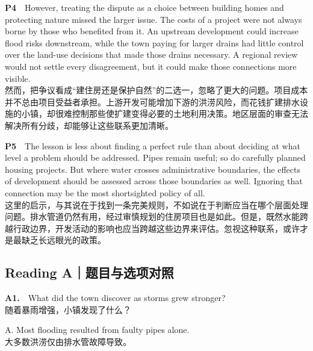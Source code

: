\documentclass[a4paper,11pt,openany]{report}
\newcommand{\zhline}[1]{{\CJKsf\color{bodygrey}#1}}
\begin{document}
\begin{samepage}
\textbf{P4}　However, treating the dispute as a choice between building homes and protecting nature missed the larger issue. The costs of a project were not always borne by those who benefited from it. An upstream development could increase flood risks downstream, while the town paying for larger drains had little control over the land-use decisions that made those drains necessary. A regional review would not settle every disagreement, but it could make those connections more visible.\\
\zhline{然而，把争议看成``建住房还是保护自然''的二选一，忽略了更大的问题。项目成本并不总由项目受益者承担。上游开发可能增加下游的洪涝风险，而花钱扩建排水设施的小镇，却很难控制那些使扩建变得必要的土地利用决策。地区层面的审查无法解决所有分歧，却能够让这些联系更加清晰。}
\par\end{samepage}

\begin{samepage}
\textbf{P5}　The lesson is less about finding a perfect rule than about deciding at what level a problem should be addressed. Pipes remain useful; so do carefully planned housing projects. But where water crosses administrative boundaries, the effects of development should be assessed across those boundaries as well. Ignoring that connection may be the most shortsighted policy of all.\\
\zhline{这里的启示，与其说在于找到一条完美规则，不如说在于判断应当在哪个层面处理问题。排水管道仍然有用，经过审慎规划的住房项目也是如此。但是，既然水能跨越行政边界，开发活动的影响也应当跨越这些边界来评估。忽视这种联系，或许才是最缺乏长远眼光的政策。}
\par\end{samepage}

\subsection{Reading A｜题目与选项对照}\label{reading-aux9898ux76eeux4e0eux9009ux9879ux5bf9ux7167}

\begin{samepage}
\textbf{A1.}　What did the town discover as storms grew stronger?\\
\zhline{随着暴雨增强，小镇发现了什么？}
\par\end{samepage}

\begin{samepage}
A. Most flooding resulted from faulty pipes alone.\\
\zhline{大多数洪涝仅由排水管故障导致。}
\par\end{samepage}
\end{document}
